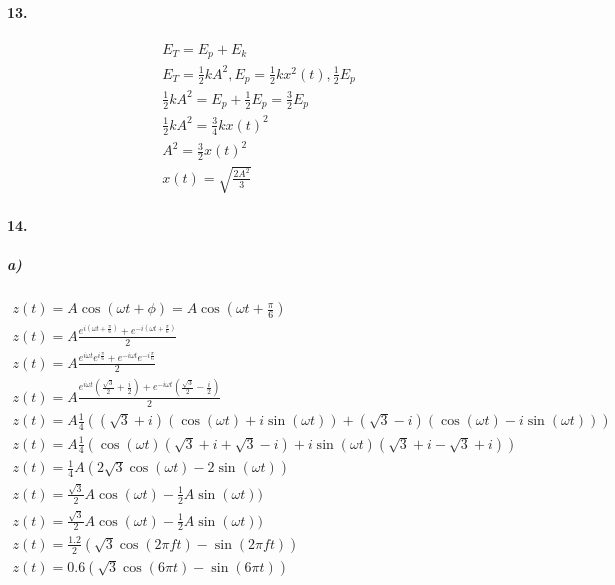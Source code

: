\documentclass[11pt, A4paper,norsk]{article}
\begin{document}
		\paragraph{13.}
			\begin{gather}
E_T = E_p + E_k \\
E_T = \frac{1}{2}kA^2, E_p = \frac{1}{2} k x^2(t), \frac{1}{2} E_p \\
\frac{1}{2} k A^2 = E_p + \frac{1}{2} E_p = \frac{3}{2} E_p \\
\frac{1}{2} k A^2 = \frac{3}{4} k x(t)^2 \\
A^2 = \frac{3}{2} x(t)^2 \\
x(t) = \sqrt{\frac{2A^2}{3}}
			\end{gather}












		\paragraph{14.}
			\subparagraph{a)}
				\begin{gather*}
z(t) = A \cos(\omega t + \phi) = A \cos\left(\omega t + \frac{\pi}{6}\right) \\
z(t) = A\frac{e^{i\left( \omega t + \frac{\pi}{6} \right)} + e^{-i\left( \omega t + \frac{\pi}{6} \right)}}{2} \\
z(t) = A\frac{e^{i \omega t}e^{i\frac{\pi}{6}} + e^{-i \omega t}e^{-i\frac{\pi}{6}}}{2} \\
z(t) = A\frac{e^{i \omega t}(\frac{\sqrt{3}}{2} + \frac{i}{2}) + e^{-i \omega t}(\frac{\sqrt{3}}{2} - \frac{i}{2})}{2} \\
z(t) = A\frac{1}{4}((\sqrt{3} + i)(\cos(\omega t) + i\sin(\omega t)) + (\sqrt{3} - i)(\cos(\omega t) - i\sin(\omega t))) \\
z(t) = A \frac{1}{4}( \cos(\omega t) (\sqrt{3} + i + \sqrt{3} - i) + i\sin(\omega t) (\sqrt{3} + i - \sqrt{3} + i)) \\
z(t) = \frac{1}{4} A (2\sqrt{3} \cos(\omega t) - 2\sin(\omega t)) \\
z(t) = \frac{\sqrt{3}}{2} A \cos(\omega t) - \frac{1}{2} A \sin(\omega t)) \\
z(t) = \frac{\sqrt{3}}{2} A \cos(\omega t) - \frac{1}{2} A \sin(\omega t)) \\
z(t) = \frac{1.2}{2}(\sqrt{3}\cos(2\pi f t) - \sin(2\pi f t)) \\
z(t) = 0.6\left(\sqrt{3}\cos(6\pi t) - \sin(6\pi t)\right)
				\end{gather*}
\end{document}
